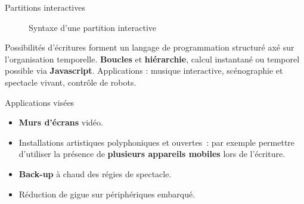 \begin{block}{Partitions interactives}
\begin{figure}
\caption{Syntaxe d'une partition interactive}
\end{figure}
Possibilités d'écritures forment un langage de programmation structuré axé sur l'organisation temporelle. 
\textbf{Boucles} et \textbf{hiérarchie}, calcul instantané ou temporel possible via \textbf{Javascript}.
Applications : musique interactive, scénographie et spectacle vivant, contrôle de robots.
\end{block}
\begin{block}{Applications visées}
    \begin{itemize}
        \item \textbf{Murs d'écrans} vidéo.
        \item Installations artistiques polyphoniques et ouvertes~: 
        par exemple permettre d'utiliser la présence de \textbf{plusieurs appareils mobiles} 
        lors de l'écriture.
        \item \textbf{Back-up} à chaud des régies de spectacle.
        \item Réduction de gigue sur périphériques embarqué.
    \end{itemize}
\end{block}
